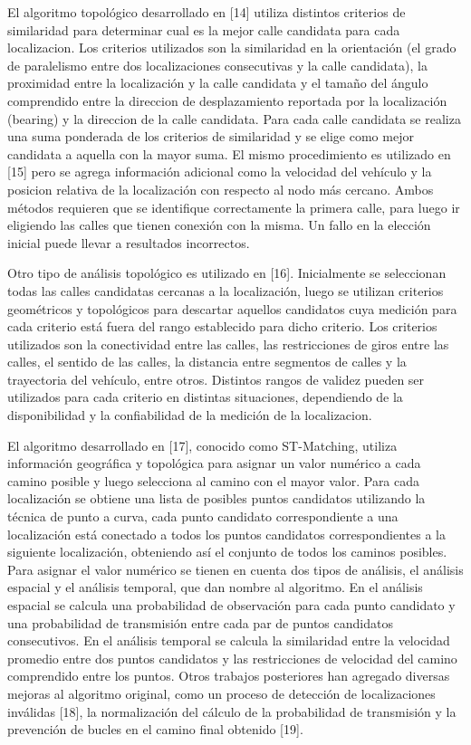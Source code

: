 \documentclass[final,fmstyle]{fpunathesis}
\begin{document}
El algoritmo topológico desarrollado en [14] utiliza distintos criterios de similaridad para determinar cual es la mejor calle candidata para cada localizacion. Los criterios utilizados son la similaridad en la orientación (el grado de paralelismo entre dos localizaciones consecutivas y la calle candidata), la proximidad entre la localización y la calle candidata y el tamaño del ángulo comprendido entre la direccion de desplazamiento reportada por la localización (bearing) y la direccion de la calle candidata. Para cada calle candidata se realiza una suma ponderada de los criterios de similaridad y se elige como mejor candidata a aquella con la mayor suma. El mismo procedimiento es utilizado en [15] pero se agrega información adicional como la velocidad del vehículo y la posicion relativa de la localización con respecto al nodo más cercano. Ambos métodos requieren que se identifique correctamente la primera calle, para luego ir eligiendo las calles que tienen conexión con la misma. Un fallo en la elección inicial puede llevar a resultados incorrectos.

Otro tipo de análisis topológico es utilizado en [16]. Inicialmente se seleccionan todas las calles candidatas cercanas a la localización, luego se utilizan criterios geométricos y topológicos para descartar aquellos candidatos cuya medición para cada criterio está fuera del rango establecido para dicho criterio. Los criterios utilizados son la conectividad entre las calles, las restricciones de giros entre las calles, el sentido de las calles, la distancia entre segmentos de calles y la trayectoria del vehículo, entre otros. Distintos rangos de validez pueden ser utilizados para cada criterio en distintas situaciones, dependiendo de la disponibilidad y la confiabilidad de la medición de la localizacion.

El algoritmo desarrollado en [17], conocido como ST-Matching, utiliza información geográfica y topológica para asignar un valor numérico a cada camino posible y luego selecciona al camino con el mayor valor. Para cada localización se obtiene una lista de  posibles puntos candidatos utilizando la técnica de punto a curva, cada punto candidato correspondiente a una localización está conectado a todos los puntos candidatos correspondientes a la siguiente localización, obteniendo así el conjunto de todos los caminos posibles. Para asignar el valor numérico se tienen en cuenta dos tipos de análisis, el análisis espacial y el análisis temporal, que dan nombre al algoritmo. En el análisis espacial se calcula una probabilidad de observación para cada punto candidato y una probabilidad de transmisión entre cada par de puntos candidatos consecutivos. En el análisis temporal se calcula la similaridad entre la velocidad promedio entre dos puntos candidatos y las restricciones de velocidad del camino comprendido entre los puntos. Otros trabajos posteriores han agregado diversas mejoras al algoritmo original, como un proceso de detección de localizaciones inválidas [18], la normalización del cálculo de la probabilidad de transmisión y la prevención de bucles en el camino final obtenido [19].
\end{document}
